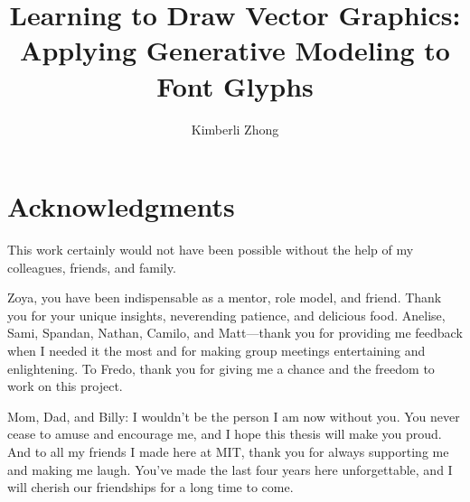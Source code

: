 \title{Learning to Draw Vector Graphics: Applying Generative Modeling to Font Glyphs}

\author{Kimberli Zhong}






\maketitle

\cleardoublepage{}
\setcounter{savepage}{\thepage}
\begin{abstractpage}

\end{abstractpage}

\cleardoublepage{}

\section*{Acknowledgments}

This work certainly would not have been possible without the help of my colleagues, friends, and family.

Zoya, you have been indispensable as a mentor, role model, and friend.
Thank you for your unique insights, neverending patience, and delicious food.
Anelise, Sami, Spandan, Nathan, Camilo, and Matt---thank you for providing me feedback when I needed it the most and for making group meetings entertaining and enlightening.
To Fredo, thank you for giving me a chance and the freedom to work on this project.

Mom, Dad, and Billy: I wouldn't be the person I am now without you.
You never cease to amuse and encourage me, and I hope this thesis will make you proud.
And to all my friends I made here at MIT, thank you for always supporting me and making me laugh.
You've made the last four years here unforgettable, and I will cherish our friendships for a long time to come.
